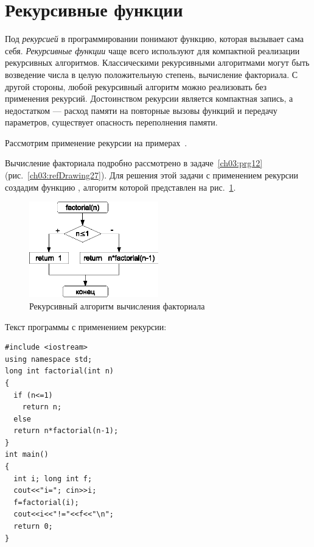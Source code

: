 \section[Рекурсивные функции]{Рекурсивные функции}
Под \emph{рекурсией} в программировании понимают функцию, которая вызывает сама себя.
\emph{Рекурсивные функции} чаще всего используют для компактной реализации
рекурсивных алгоритмов. Классическими рекурсивными алгоритмами могут быть возведение числа в целую положительную
степень, вычисление факториала. С другой стороны, любой рекурсивный алгоритм можно реализовать без применения рекурсий.
Достоинством рекурсии является компактная запись, а недостатком --- расход памяти на повторные вызовы функций и передачу
параметров, существует опасность переполнения памяти.

Рассмотрим применение рекурсии на примерах~\cite{C,Shim}. %


Вычисление факториала подробно рассмотрено в задаче~\ref{ch03:prg12} 
(рис.~\ref{ch03:refDrawing27}). Для решения этой задачи с применением рекурсии
создадим функцию , алгоритм которой представлен на рис.~\ref{ch04:refDrawing9}. 

\begin{figure}[htb]
\begin{center}
\includegraphics[width=0.5\textwidth]{img/ris_4_10}
\caption{Рекурсивный алгоритм вычисления факториала}
\label{ch04:refDrawing9}
\end{center}
\end{figure}


Текст программы с применением рекурсии:
\begin{lstlisting}
#include <iostream>
using namespace std;
long int factorial(int n)
{
  if (n<=1) 
    return n; 
  else 
  return n*factorial(n-1); 
}
int main()
{
  int i; long int f;
  cout<<"i="; cin>>i;
  f=factorial(i); 
  cout<<i<<"!="<<f<<"\n"; 
  return 0;
}
\end{lstlisting}

